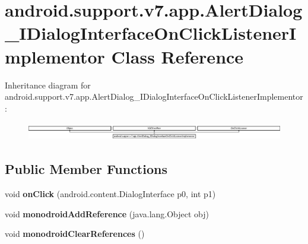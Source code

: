\hypertarget{classandroid_1_1support_1_1v7_1_1app_1_1AlertDialog__IDialogInterfaceOnClickListenerImplementor}{}\section{android.\+support.\+v7.\+app.\+Alert\+Dialog\+\_\+\+I\+Dialog\+Interface\+On\+Click\+Listener\+Implementor Class Reference}
\label{classandroid_1_1support_1_1v7_1_1app_1_1AlertDialog__IDialogInterfaceOnClickListenerImplementor}
Inheritance diagram for android.\+support.\+v7.\+app.\+Alert\+Dialog\+\_\+\+I\+Dialog\+Interface\+On\+Click\+Listener\+Implementor\+:\begin{figure}[H]
\begin{center}
\leavevmode
\includegraphics[height=0.790960cm]{classandroid_1_1support_1_1v7_1_1app_1_1AlertDialog__IDialogInterfaceOnClickListenerImplementor}
\end{center}
\end{figure}
\subsection*{Public Member Functions}
\begin{DoxyCompactItemize}
\item 
\mbox{\label{classandroid_1_1support_1_1v7_1_1app_1_1AlertDialog__IDialogInterfaceOnClickListenerImplementor_a8e35c027fd2de981ed97054edd6cb86f}} 
void {\bfseries on\+Click} (android.\+content.\+Dialog\+Interface p0, int p1)
\item 
\mbox{\label{classandroid_1_1support_1_1v7_1_1app_1_1AlertDialog__IDialogInterfaceOnClickListenerImplementor_a7625377f1befd57755de35ba74a4fb9f}} 
void {\bfseries monodroid\+Add\+Reference} (java.\+lang.\+Object obj)
\item 
\mbox{\label{classandroid_1_1support_1_1v7_1_1app_1_1AlertDialog__IDialogInterfaceOnClickListenerImplementor_ab97868ba78e36937f05c4e816bb3cb5b}} 
void {\bfseries monodroid\+Clear\+References} ()
\end{DoxyCompactItemize}
